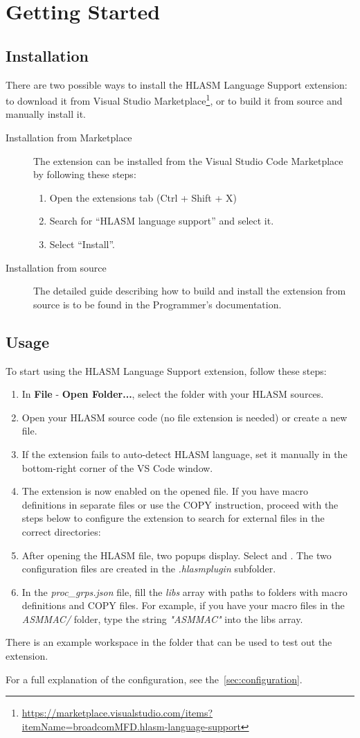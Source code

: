 \section{Getting Started}
\label{sec:start}

\subsection{Installation}
There are two possible ways to install the HLASM Language Support extension: to download it from Visual Studio Marketplace\footnote{\url{https://marketplace.visualstudio.com/items?itemName=broadcomMFD.hlasm-language-support}}, or to build it from source and manually install it.

\begin{description}
	\item[Installation from Marketplace]
	The extension can be installed from the Visual Studio Code Marketplace by following these steps:
	\begin{enumerate}
		\item Open the extensions tab (Ctrl + Shift + X)
		\item Search for ``HLASM language support'' and select it.
		\item Select ``Install''.
	\end{enumerate}
	\item[Installation from source]
	The detailed guide describing how to build and install the extension from source is to be found in the Programmer's documentation.
\end{description}

\subsection{Usage}
To start using the HLASM Language Support extension, follow these steps:

\begin{enumerate}
	\item In \textbf{File} - \textbf{Open Folder...}, select the folder with your HLASM sources.
	\item Open your HLASM source code (no file extension is needed) or create a new file.
	\item If the extension fails to auto-detect HLASM language, set it manually in the bottom-right corner of the VS Code window.  
	\item The extension is now enabled on the opened file. If you have macro definitions in separate files or use the COPY instruction, proceed with the steps below to configure the extension to search for external files in the correct directories:
	\item After opening the HLASM file, two popups display. Select  and . The two configuration files are created in the \emph{.hlasmplugin} subfolder.
	\item In the \emph{proc\_grps.json} file, fill the \emph{libs} array with paths to folders with macro definitions and COPY files. For example, if you have your macro files in the \emph{ASMMAC/} folder, type the string \emph{"ASMMAC"} into the libs array.
\end{enumerate}

There is an example workspace in the folder  that can be used to test out the extension.

For a full explanation of the configuration, see the~\cref{sec:configuration}.
